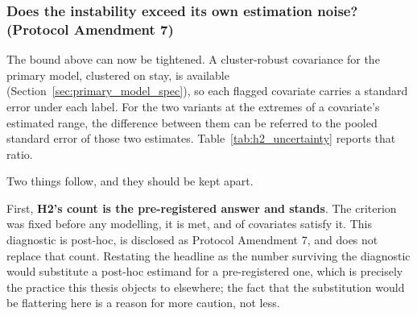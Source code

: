 \subsubsection{Does the instability exceed its own estimation noise? (Protocol
Amendment 7)}
\label{sec:h2_uncertainty}

The bound above can now be tightened. A cluster-robust covariance for the
primary model, clustered on stay, is available
(Section~\ref{sec:primary_model_spec}), so each flagged covariate carries a
standard error under each label. For the two variants at the extremes of a
covariate's estimated range, the difference between them can be referred to the
pooled standard error of those two estimates. Table~\ref{tab:h2_uncertainty}
reports that ratio.

\begin{table}[H]
    \centering\footnotesize\setlength{\tabcolsep}{4pt}
    \caption[H2 instability against estimation noise]{Each covariate flagged by
    H2, with its coefficient under each label variant, the difference between
    the two extremes, the pooled cluster-robust standard error of those two
    estimates, and their ratio. \pcHTwoNRobust{} of the \pcHTwoNFlagged{}
    flagged covariates move by more than roughly twice their pooled standard
    error; the remaining \pcHTwoNNoise{} move by less, the largest such ratio
    being \pcHTwoZMaxNoise. The separation is clean rather than marginal: no
    covariate falls between \pcHTwoZMaxNoise{} and \pcHTwoZMinRobust, so the
    split does not depend on where the cut is placed. ``Kind'' marks whether
    the covariate records clinician action or patient physiology
    (Section~\ref{sec:h2_action}). \textbf{This is a diagnostic, not a test}:
    the three fits share stays, so the estimates being differenced are
    correlated and the pooled standard error assumes they are not; and because
    the specification is ridge-penalised out of necessity, the covariance is
    that of the penalised estimator. No $p$-value is computed and none should
    be inferred from the ratio.}
    \label{tab:h2_uncertainty}
\end{table}

Two things follow, and they should be kept apart.

First, \textbf{H2's count is the pre-registered answer and stands}. The
criterion was fixed before any modelling, it is met, and
\pcHTwoEst{} of \pcHTwoNTerms{} covariates satisfy it. This diagnostic is
post-hoc, is disclosed as Protocol Amendment 7, and does not replace that
count. Restating the headline as the number surviving the diagnostic would
substitute a post-hoc estimand for a pre-registered one, which is precisely the
practice this thesis objects to elsewhere; the fact that the substitution would
be flattering here is a reason for more caution, not less.

